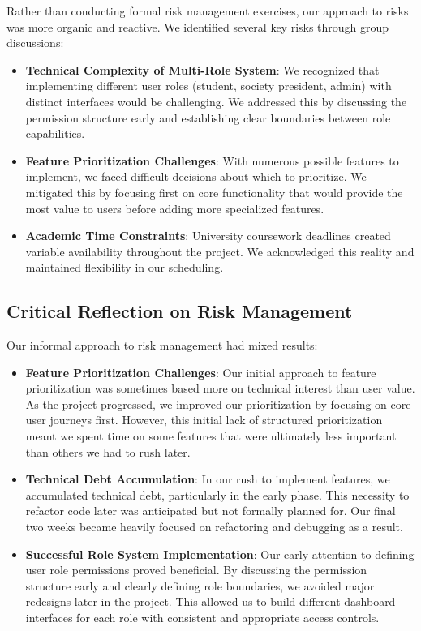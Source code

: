 Rather than conducting formal risk management exercises, our approach to risks was more organic and reactive. We identified several key risks through group discussions:

\begin{itemize}
    \item \textbf{Technical Complexity of Multi-Role System}: We recognized that implementing different user roles (student, society president, admin) with distinct interfaces would be challenging. We addressed this by discussing the permission structure early and establishing clear boundaries between role capabilities.
    
    \item \textbf{Feature Prioritization Challenges}: With numerous possible features to implement, we faced difficult decisions about which to prioritize. We mitigated this by focusing first on core functionality that would provide the most value to users before adding more specialized features.
    
    \item \textbf{Academic Time Constraints}: University coursework deadlines created variable availability throughout the project. We acknowledged this reality and maintained flexibility in our scheduling.
\end{itemize}

\subsection{Critical Reflection on Risk Management}

Our informal approach to risk management had mixed results:

\begin{itemize}
    \item \textbf{Feature Prioritization Challenges}: Our initial approach to feature prioritization was sometimes based more on technical interest than user value. As the project progressed, we improved our prioritization by focusing on core user journeys first. However, this initial lack of structured prioritization meant we spent time on some features that were ultimately less important than others we had to rush later.
    
    \item \textbf{Technical Debt Accumulation}: In our rush to implement features, we accumulated technical debt, particularly in the early phase. This necessity to refactor code later was anticipated but not formally planned for. Our final two weeks became heavily focused on refactoring and debugging as a result.
    
    \item \textbf{Successful Role System Implementation}: Our early attention to defining user role permissions proved beneficial. By discussing the permission structure early and clearly defining role boundaries, we avoided major redesigns later in the project. This allowed us to build different dashboard interfaces for each role with consistent and appropriate access controls.
\end{itemize}

